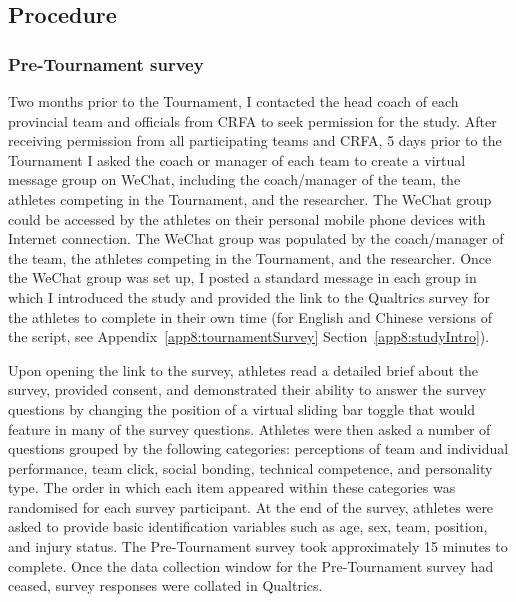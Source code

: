 \begin{CJK}{UTF8}{gbsn}









\subsection{Procedure}

\subsubsection{Pre-Tournament survey}
Two months prior to the Tournament, I contacted the head coach of each provincial team and officials from CRFA to seek permission for the study.  After receiving permission from all participating teams and CRFA, 5 days prior to the Tournament I asked the coach or manager of each team to create a virtual message group on WeChat, including the coach/manager of the team, the athletes competing in the Tournament, and the researcher.  The WeChat group could be accessed by the athletes on their personal mobile phone devices with Internet connection. The WeChat group was populated by the coach/manager of the team, the athletes competing in the Tournament, and the researcher. Once the WeChat group was set up, I posted a standard message in each group in which I introduced the study and provided the link to the Qualtrics survey for the athletes to complete in their own time (for English and Chinese versions of the script, see Appendix~\ref{app8:tournamentSurvey} Section~\ref{app8:studyIntro}).

Upon opening the link to the survey, athletes read a detailed brief about the survey, provided consent, and demonstrated their ability to answer the survey questions by changing the position of a virtual sliding bar toggle that would feature in many of the survey questions.  Athletes were then asked a number of questions grouped by the following categories: perceptions of team and individual performance, team click, social bonding, technical competence, and personality type. The order in which each item appeared within these categories was randomised for each survey participant. At the end of the survey, athletes were asked to provide basic identification variables such as age, sex, team, position, and injury status.  The Pre-Tournament survey took approximately 15 minutes to complete.  Once the data collection window for the Pre-Tournament survey had ceased, survey responses were collated in Qualtrics.


\end{CJK}
